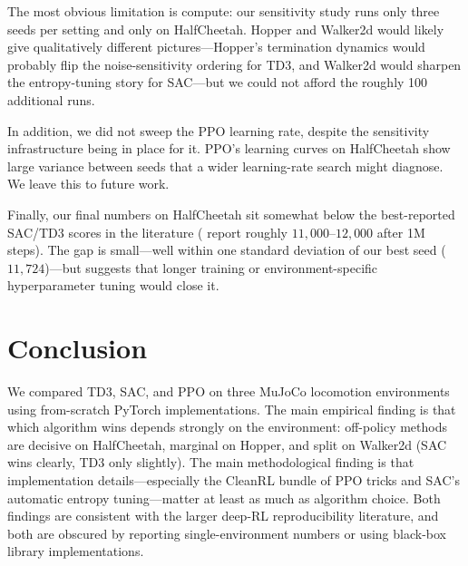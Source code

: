\documentclass[letterpaper]{article}
\begin{document}
The most obvious limitation is compute: our sensitivity study runs only
three seeds per setting and only on HalfCheetah. Hopper and Walker2d
would likely give qualitatively different pictures---Hopper's termination
dynamics would probably flip the noise-sensitivity ordering for TD3, and
Walker2d would sharpen the entropy-tuning story for SAC---but we could
not afford the roughly 100 additional runs.

In addition, we did not sweep the PPO learning rate, despite the
sensitivity infrastructure being in place for it. PPO's learning curves
on HalfCheetah show large variance between seeds that a wider learning-rate
search might diagnose. We leave this to future work.

Finally, our final numbers on HalfCheetah sit somewhat below the
best-reported SAC/TD3 scores in the literature
(\citealp{haarnoja2018sac,fujimoto2018td3} report roughly $11{,}000$--$12{,}000$
after 1M steps). The gap is small---well within one standard deviation of
our best seed ($11{,}724$)---but suggests that longer training or
environment-specific hyperparameter tuning would close it.

\section{Conclusion}

We compared TD3, SAC, and PPO on three MuJoCo locomotion environments
using from-scratch PyTorch implementations. The main empirical finding is
that which algorithm wins depends strongly on the environment:
off-policy methods are decisive on HalfCheetah, marginal on Hopper, and
split on Walker2d (SAC wins clearly, TD3 only slightly). The main
methodological finding is that implementation details---especially the
CleanRL bundle of PPO tricks and SAC's automatic entropy tuning---matter
at least as much as algorithm choice. Both findings are consistent with
the larger deep-RL reproducibility literature, and both are obscured by
reporting single-environment numbers or using black-box library
implementations.


\end{document}
